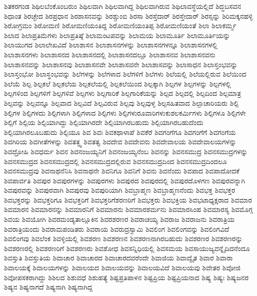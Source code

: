 {ಶಿತಕರಗಂಡ
ಶಿಥಿಲಬೆಂಕೊಂಬರುಂ
ಶಿಥಿಲವಾಗಿ
ಶಿಥಿಲವಾಗಿದ್ದ
ಶಿಥಿಲವಾಗಿರುವ
ಶಿಥಿಲಾವಸ್ಥೆಯಲ್ಲಿದೆ
ಶಿದ್ಧಬಸವನ
ಶಿಧಾಂತ
ಶಿರಚ್ಛೇದ
ಶಿರಪ್ರಧಾನ
ಶಿರಶಾಸನವನ್ನು
ಶಿರಶ್ಚುಂಬಿ
ಶಿರಸಾ
ಶಿರಸ್ತೆದಾರ್
ಶಿರಸ್ತೇದಾರ್
ಶಿರಸ್ಸನ್ನು
ಶಿರಿಮಕ್ಕನಹಳ್ಳಿ
ಶಿರೋಗ್ರಮಂ
ಶಿರೋಮಣಿ
ಶಿರೋಮಣಿಯಂತಿದ್ದ
ಶಿರೋಮಣಿಯಂತಿಪ್ಪ
ಶಿರೋಮಣಿಯಂತೆ
ಶಿಲಾ
ಶಿಲಾಕರ್ಮ್ಮ
ಶಿಲಾದ
ಶಿಲಾಪ್ರತಿಮೆಗಳು
ಶಿಲಾಪ್ರತಿಷ್ಠೆ
ಶಿಲಾಮಂಟಪವನ್ನು
ಶಿಲಾಮಯ
ಶಿಲಾಮೂರ್ತಿ
ಶಿಲಾಮೂರ್ತಿಯನ್ನು
ಶಿಲಾಯುಗದ
ಶಿಲಾಲೇಖವಿದೆ
ಶಿಲಾಶಾಸನ
ಶಿಲಾಶಾಸನಗಳನ್ನು
ಶಿಲಾಶಾಸನಗಳನ್ನೂ
ಶಿಲಾಶಾಸನಗಳಲ್ಲಿ
ಶಿಲಾಶಾಸನಗಳು
ಶಿಲಾಶಾಸನದ
ಶಿಲಾಶಾಸನದಲ್ಲಿ
ಶಿಲಾಶಾಸನದಲ್ಲೂ
ಶಿಲಾಶಾಸನವ
ಶಿಲಾಶಾಸನವನು
ಶಿಲಾಶಾಸನವನ್ನು
ಶಿಲಾಶಾಸನವು
ಶಿಲಾಶಾಸನವೇ
ಶಿಲಾಶಾಸವನೇ
ಶಿಲಾಶಾಸವನ್ನು
ಶಿಲಾಸಾಧನ
ಶಿಲಾಸ್ತಂಭವನ್ನು
ಶಿಲಾಸ್ತಂಭೋ
ಶಿಲಾಸ್ಥಂಭವನ್ನು
ಶಿಲೆಗಳನ್ನು
ಶಿಲೆಗಳಾದ
ಶಿಲೆಗಳಿಗೆ
ಶಿಲೆಗಳು
ಶಿಲೆಯಲ್ಲಿ
ಶಿಲೆಯಲ್ಲಿರುವ
ಶಿಲೆಯಿಂದ
ಶಿಲೆಯೆ
ಶಿಲ್ಪ
ಶಿಲ್ಪಕಲೆ
ಶಿಲ್ಪಕಲೆಯ
ಶಿಲ್ಪಕಲೆಯಲ್ಲಿ
ಶಿಲ್ಪಕಲೆಯಿಂದ
ಶಿಲ್ಪಕ್ಕಾಗಿ
ಶಿಲ್ಪಗಳ
ಶಿಲ್ಪಗಳನ್ನು
ಶಿಲ್ಪಗಳಲ್ಲಿ
ಶಿಲ್ಪಗಳಿಂದ
ಶಿಲ್ಪಗಳಿಗೆ
ಶಿಲ್ಪಗಳಿವೆ
ಶಿಲ್ಪಗಳು
ಶಿಲ್ಪಗಾರಿಕೆ
ಶಿಲ್ಪಗಾರಿಕೆಯನ್ನು
ಶಿಲ್ಪದ
ಶಿಲ್ಪದಲ್ಲಿ
ಶಿಲ್ಪದಿಂದ
ಶಿಲ್ಪಮಾತ್ರ
ಶಿಲ್ಪವನ್ನು
ಶಿಲ್ಪವನ್ನೂ
ಶಿಲ್ಪವಾದ
ಶಿಲ್ಪವಿದೆ
ಶಿಲ್ಪವಿರುವ
ಶಿಲ್ಪವು
ಶಿಲ್ಪವುಳ್ಳ
ಶಿಲ್ಪಸಹಿತವಾದ
ಶಿಲ್ಪಾಚಾರಿಯರು
ಶಿಲ್ಪಿ
ಶಿಲ್ಪಿಗಳ
ಶಿಲ್ಪಿಗಳದು
ಶಿಲ್ಪಿಗಳಾಗಿ
ಶಿಲ್ಪಿಗಳಾದ
ಶಿಲ್ಪಿಗಳು
ಶಿಲ್ಪಿಗಳುರೂವಾರಿಗಳುಕುಶಲಕರ್ಮಿಗಳು
ಶಿಲ್ಪಿಗಳೂ
ಶಿಲ್ಪಿಗಳೇ
ಶಿಲ್ಪಿಗೆ
ಶಿಲ್ಪಿಯ
ಶಿಲ್ಪಿಯಾಗಿದ್ದು
ಶಿಲ್ಪಿಯಾಗಿರದೇ
ಶಿಲ್ಪಿಯಾಗಿರಬಹುದು
ಶಿಲ್ಪಿಯಾಗಿರಬಹುದೆಂದು
ಶಿಲ್ಪಿಯಾಗಿರಲೂಬಹುದು
ಶಿಲ್ಪಿಯೂ
ಶಿವ
ಶಿವಃ
ಶಿವಕಥಾಳಾಪೆ
ಶಿವಕೆರೆ
ಶಿವಗಂಗೆಗೂ
ಶಿವಗಂಗೆಗೆ
ಶಿವಗಂಗೆಯ
ಶಿವಗಿರಿಯ
ಶಿವಗೀತೆಗಳನ್ನು
ಶಿವತತ್ತ್ವ
ಶಿವತತ್ವ
ಶಿವದೇವ
ಶಿವದೇವನು
ಶಿವದೇವಾಲಯ
ಶಿವದೇವಾಲಯಗಳನ್ನು
ಶಿವದ್ರೋಹಿ
ಶಿವಧರ್ಮ
ಶಿವನ
ಶಿವನಂಜಯ್ಯನಿಗೆ
ಶಿವನಂಜಯ್ಯನೆಂಬ
ಶಿವನನ್ನು
ಶಿವನಸಮುದ್ರ
ಶಿವನಸಮುದ್ರಗಳನ್ನು
ಶಿವನಸಮುದ್ರದ
ಶಿವನಸಮುದ್ರದಲ್ಲಿ
ಶಿವನಸಮುದ್ರದಲ್ಲಿರುವ
ಶಿವನಸಮುದ್ರದಿಂದ
ಶಿವನಸಮುದ್ರದಿಂದಲೂ
ಶಿವನಸಮುದ್ರವು
ಶಿವನಾಥನೆನಿಸಿ
ಶಿವನಾಥನೇ
ಶಿವನಿಗೂ
ಶಿವನಿಗೆ
ಶಿವನು
ಶಿವನೆಂದು
ಶಿವಪಾದ
ಶಿವಪಾದೋದಕೆ
ಶಿವಪಾರ್ವತಿ
ಶಿವಪುರ
ಶಿವಪುರಗಳನ್ನು
ಶಿವಪುರಗಳು
ಶಿವಪುರದ
ಶಿವಪುರದಲ್ಲಿ
ಶಿವಪುರದೊಳಗಣ
ಶಿವಪುರವನ್ನಾಗಿ
ಶಿವಪುರವನ್ನು
ಶಿವಪುರವಾಗಿ
ಶಿವಪುರವು
ಶಿವಪುರಿಯಾಗಿ
ಶಿವಬ್ರಾಹ್ಮಣ
ಶಿವಬ್ರಾಹ್ಮಣನೆಂದು
ಶಿವಭಕ್ತ
ಶಿವಭಕ್ತರ
ಶಿವಭಕ್ತರನ್ನು
ಶಿವಭಕ್ತರಿಗೂ
ಶಿವಭಕ್ತರಿಗೆ
ಶಿವಭಕ್ತರಿಗೆಶರಣರಿಗೆ
ಶಿವಭಕ್ತರು
ಶಿವಭಕ್ತಿಯ
ಶಿವಭಟಾಧ್ಯಕ್ಷರಾದ
ಶಿವಮಾರ
ಶಿವಮಾರನ
ಶಿವಮಾರನನ್ನು
ಶಿವಮಾರನಿಗೆ
ಶಿವಮಾರನು
ಶಿವಮಾರಶರ್ಮನು
ಶಿವಮಾರಸಿಂಹ
ಶಿವಮಾರಸ್ಯ
ಶಿವಮೊಗ್ಗ
ಶಿವಯ
ಶಿವಯೋಗಿ
ಶಿವರಮಂಡ್ಯತಾಲ್ಲೂಕಿನ
ಶಿವರಶರಣರ
ಶಿವರಾಚಯ್ಯ
ಶಿವರಾಜ
ಶಿವರಾಜನು
ಶಿವರಾತ್ರಿಯ
ಶಿವರಾತ್ರಿಯಂದು
ಶಿವರಾಮಪಂಡಿತರು
ಶಿವರಾಯ
ಶಿವರುದ್ರಸ್ವಾಮಿ
ಶಿವಲಿಂಗ
ಶಿವಲಿಂಗವನ್ನು
ಶಿವಲಿಂಗವಿದೆ
ಶಿವಲಿಂಗವು
ಶಿವಲೆಂಕ
ಶಿವಳ್ಳಿಯಲ್ಲಿ
ಶಿವಶರಣ
ಶಿವಶರಣನ
ಶಿವಶರಣನಾಗಿರಬಹುದು
ಶಿವಶರಣರ
ಶಿವಶರಣರನ್ನು
ಶಿವಶರಣರಲ್ಲಿ
ಶಿವಶರಣರಿಗೆ
ಶಿವಶರಣರು
ಶಿವಶೋಧ
ಶಿವಸನ್ನಿಧಿಯಲ್ಲಿ
ಶಿವಸಮಯ
ಶಿವಸಾಯುಜ್ಯವನ್ನೈದಿದನೆಂದೂ
ಶಿವಸ್ತುತಿ
ಶಿವಸ್ತುತಿಯ
ಶಿವಾಚಾರ
ಶಿವಾಚಾರದ
ಶಿವಾಚಾರದವರೆಂದೇ
ಶಿವಾಜಿಯ
ಶಿವಾದ್ವೈತ
ಶಿವಾರ
ಶಿವಾರಾ
ಶಿವಾಲಯಕ್ಕೆ
ಶಿವಾಲಯಗಳನ್ನು
ಶಿವಾಲಯದ
ಶಿವಾಲಯವನ್ನು
ಶಿವಾಲಯವಿದೆ
ಶಿವಾಲಯವು
ಶಿವೇತರ
ಶಿವೋಜಿ
ಶಿವೋಪಸಕರಾಗಿದ್ದು
ಶಿಶಿಲದ
ಶಿಶುವಧೆ
ಶಿಶುಹತ್ಯೆ
ಶಿಷ್ಟಪ್ರತಿಪಾಳನ
ಶಿಷ್ಟಪ್ರಿಯ
ಶಿಷ್ಟಪ್ರಿಯನಾದ
ಶಿಷ್ಯ
ಶಿಷ್ಯಃ
ಶಿಷ್ಯಜನರ
ಶಿಷ್ಯನ
ಶಿಷ್ಯನಾಗದೆ
ಶಿಷ್ಯನಾಗಿ
ಶಿಷ್ಯನಾಗಿದ್ದ
}
